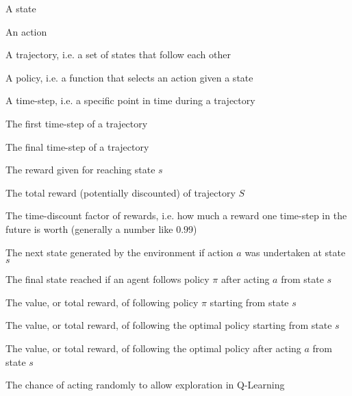\begin{description}[style=sameline,leftmargin=3cm,font=\normalfont]
  \item[$s$] A state\\
  \item[$a$] An action\\
  \item[$S$] A trajectory, i.e. a set of states that follow each other\\
  \item[$\pi$] A policy, i.e. a function that selects an action given a state\\
  \item[$t$] A time-step, i.e. a specific point in time during a trajectory\\
  \item[$t_0$] The first time-step of a trajectory\\
  \item[$t_{end}$] The final time-step of a trajectory\\
  \item[$r(s)$] The reward given for reaching state $s$\\
  \item[$R(S)$] The total reward (potentially discounted) of trajectory $S$\\
  \item[$\gamma$] The time-discount factor of rewards, i.e. how much a reward one time-step in the future is worth (generally a number like $0.99$)\\
  \item[$Env(s, a)$] The next state generated by the environment if action $a$ was undertaken at state $s$\\
  \item[$Term_{\pi}(s, a)$] The final state reached if an agent follows policy $\pi$ after acting $a$ from state $s$\\
  \item[$V_{\pi}(s)$] The value, or total reward, of following policy $\pi$ starting from state $s$\\
  \item[$V^*(s)$] The value, or total reward, of following the optimal policy starting from state $s$\\
  \item[$Q^*(s, a)$] The value, or total reward, of following the optimal policy after acting $a$ from state $s$\\
  \item[$\epsilon$] The chance of acting randomly to allow exploration in Q-Learning\\

\end{description}

